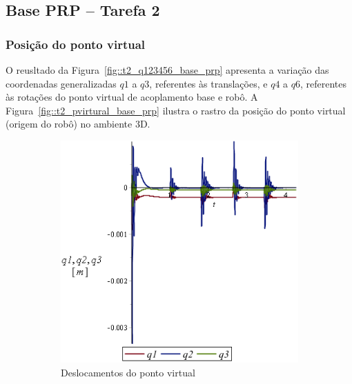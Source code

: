 \subsection{Base PRP -- Tarefa 2}

\subsubsection{Posição do ponto virtual}

O reusltado da Figura~\ref{fig::t2_q123456_base_prp} apresenta a variação das
coordenadas generalizadas $q1$ a $q3$, referentes às translações, e $q4$ a $q6$,
referentes às rotações do ponto virtual de acoplamento base e robô. A
Figura~\ref{fig::t2_pvirtural_base_prp} ilustra o rastro da posição do ponto
virtual (origem do robô) no ambiente 3D.

\begin{figure}[h]
    \centering
    \begin{subfigure}[b]{0.48\textwidth}
        \includegraphics[width=\textwidth]{figs/t2_q123_base_prp}
        \caption{Deslocamentos do ponto virtual}
        \label{fig::t2_q123_base_prp}
    \end{subfigure}
    \quad %
    \begin{subfigure}[b]{0.48\textwidth}

\end{subfigure}
\end{figure}
